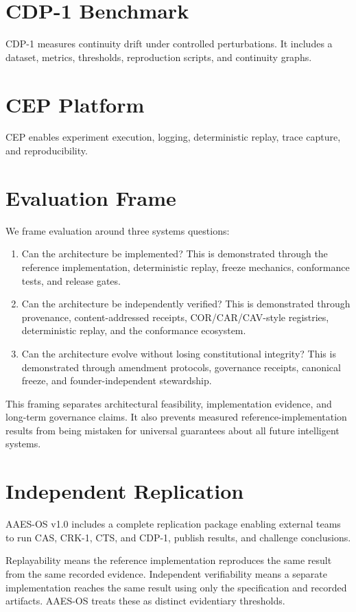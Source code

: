 \documentclass{article}
\begin{document}
\section{CDP-1 Benchmark}
CDP-1 measures continuity drift under controlled perturbations. It includes a dataset, metrics, thresholds, reproduction scripts, and continuity graphs.

\section{CEP Platform}
CEP enables experiment execution, logging, deterministic replay, trace capture, and reproducibility.

\section{Evaluation Frame}
We frame evaluation around three systems questions:
\begin{enumerate}
    \item Can the architecture be implemented? This is demonstrated through the reference implementation, deterministic replay, freeze mechanics, conformance tests, and release gates.
    \item Can the architecture be independently verified? This is demonstrated through provenance, content-addressed receipts, COR/CAR/CAV-style registries, deterministic replay, and the conformance ecosystem.
    \item Can the architecture evolve without losing constitutional integrity? This is demonstrated through amendment protocols, governance receipts, canonical freeze, and founder-independent stewardship.
\end{enumerate}

This framing separates architectural feasibility, implementation evidence, and long-term governance claims. It also prevents measured reference-implementation results from being mistaken for universal guarantees about all future intelligent systems.

\section{Independent Replication}
AAES-OS v1.0 includes a complete replication package enabling external teams to run CAS, CRK-1, CTS, and CDP-1, publish results, and challenge conclusions.

Replayability means the reference implementation reproduces the same result from the same recorded evidence. Independent verifiability means a separate implementation reaches the same result using only the specification and recorded artifacts. AAES-OS treats these as distinct evidentiary thresholds.
\end{document}
